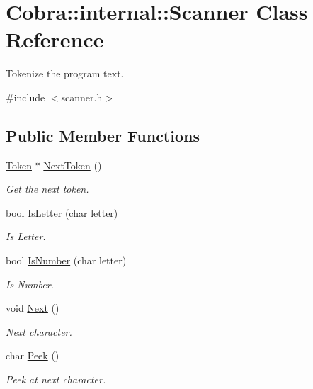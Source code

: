 \hypertarget{class_cobra_1_1internal_1_1_scanner}{\section{Cobra\+:\+:internal\+:\+:Scanner Class Reference}
\label{class_cobra_1_1internal_1_1_scanner}
}


Tokenize the program text.  




{\ttfamily \#include $<$scanner.\+h$>$}

\subsection*{Public Member Functions}
\begin{DoxyCompactItemize}
\item 
\hyperlink{class_cobra_1_1internal_1_1_token}{Token} $\ast$ \hyperlink{class_cobra_1_1internal_1_1_scanner_a6955998dffd994214f647d54b8ab7520}{Next\+Token} ()
\begin{DoxyCompactList}\small\item\em Get the next token. \end{DoxyCompactList}\item 
bool \hyperlink{class_cobra_1_1internal_1_1_scanner_ad7389381cf80cf16cfa899eb850cfba6}{Is\+Letter} (char letter)
\begin{DoxyCompactList}\small\item\em Is Letter. \end{DoxyCompactList}\item 
bool \hyperlink{class_cobra_1_1internal_1_1_scanner_a82a5e48b515f8654b4da655e383f9701}{Is\+Number} (char letter)
\begin{DoxyCompactList}\small\item\em Is Number. \end{DoxyCompactList}\item 
void \hyperlink{class_cobra_1_1internal_1_1_scanner_ad825a7aec4f91d9317ed24bcd2c30bcc}{Next} ()
\begin{DoxyCompactList}\small\item\em Next character. \end{DoxyCompactList}\item 
char \hyperlink{class_cobra_1_1internal_1_1_scanner_a88413c7cd3a38c7e5bb778c359226006}{Peek} ()
\begin{DoxyCompactList}\small\item\em Peek at next character. \end{DoxyCompactList}\item 

\end{DoxyCompactItemize}
